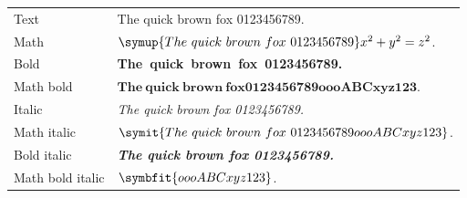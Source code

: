 \documentclass{article}
\begin{document}
\noindent
\begin{tabular}{@{}l@{\quad}l@{}}
Text & The quick brown fox 0123456789. \\
Math & \(\symup{The\ quick\ brown\ fox\ 0123456789} x^2+y^2=z^2\). \\
Bold & \textbf{The\ quick\ brown\ fox\ 0123456789.} \\
Math bold & \(\symbf{The\ quick\ brown\ fox 0123456789oooABCxyz123}\). \\
Italic & \textit{The quick brown fox 0123456789.} \\
Math italic & \(\symit{The\ quick\ brown\ fox\ 0123456789 oooABCxyz123}\). \\
Bold italic & \textbf{\textit{The quick brown fox 0123456789.}} \\
Math bold italic & \(\symbfit{oooABCxyz123}\).
\end{tabular}
\end{document}
